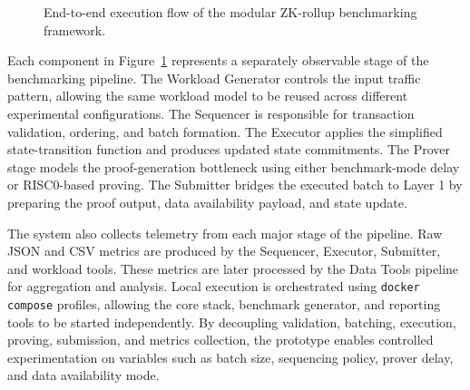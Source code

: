\begin{figure}[!htbp]
\centering
{}
\caption{End-to-end execution flow of the modular ZK-rollup benchmarking framework.}
\label{fig:end_to_end_execution_flow}
\end{figure}

Each component in Figure~\ref{fig:end_to_end_execution_flow} represents a separately observable stage of the benchmarking pipeline. The Workload Generator controls the input traffic pattern, allowing the same workload model to be reused across different experimental configurations. The Sequencer is responsible for transaction validation, ordering, and batch formation. The Executor applies the simplified state-transition function and produces updated state commitments. The Prover stage models the proof-generation bottleneck using either benchmark-mode delay or RISC0-based proving. The Submitter bridges the executed batch to Layer 1 by preparing the proof output, data availability payload, and state update.

The system also collects telemetry from each major stage of the pipeline. Raw JSON and CSV metrics are produced by the Sequencer, Executor, Submitter, and workload tools. These metrics are later processed by the Data Tools pipeline for aggregation and analysis. Local execution is orchestrated using \texttt{docker compose} profiles, allowing the core stack, benchmark generator, and reporting tools to be started independently. By decoupling validation, batching, execution, proving, submission, and metrics collection, the prototype enables controlled experimentation on variables such as batch size, sequencing policy, prover delay, and data availability mode.

